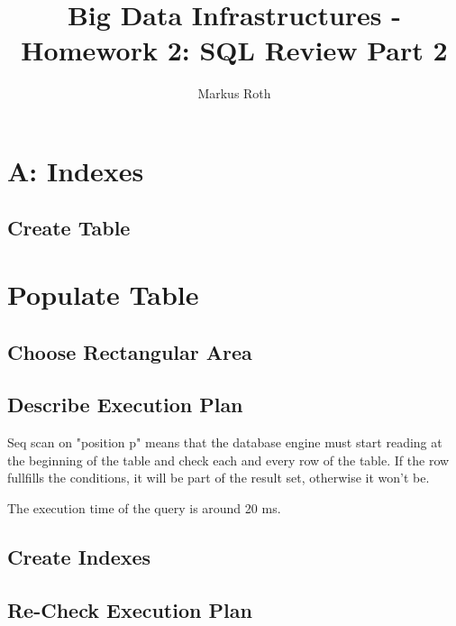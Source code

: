 \documentclass[a4paper]{article}
\title{Big Data Infrastructures - Homework 2: SQL Review Part 2}
\author{Markus Roth}
\begin{document}
\maketitle

\section{A: Indexes}
\subsection{Create Table}



\section{Populate Table}



\subsection{Choose Rectangular Area}



\subsection{Describe Execution Plan}



Seq scan on "position p" means that the database engine must start reading at the beginning of the table and check each and every row of the table. If the row fullfills the conditions, it will be part of the result set, otherwise it won't be. 

The execution time of the query is around 20 ms.

\subsection{Create Indexes}



\subsection{Re-Check Execution Plan}


\end{document}
